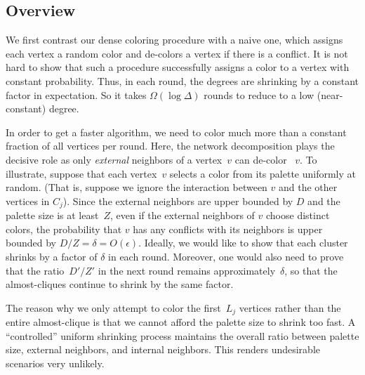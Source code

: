 \documentclass[11pt]{amsart}
\begin{document}
\subsection{Overview}
We first contrast our dense coloring procedure with a naive one, which assigns each vertex a random color and de-colors a vertex if there is a conflict. It is not hard to show that such a procedure successfully assigns a color to a vertex with constant probability. Thus, in each round, the degrees are shrinking by a constant factor in expectation. So it takes $\Omega(\log \Delta)$ rounds to reduce to a low (near-constant) degree.

In order to get a faster algorithm, we need to color much more than a constant fraction of all vertices per round. Here, the network decomposition plays the decisive role as only \emph{external} neighbors of a vertex~$v$ can de-color ~$v$. To illustrate, suppose that each vertex~$v$ selects a color from its palette uniformly at random. (That is, suppose we ignore the interaction between $v$ and the other vertices in $C_j$). Since the external neighbors are upper bounded by $D$ and the palette size is at least~$Z$, even if the external neighbors of $v$ choose distinct colors, the probability that $v$ has any conflicts with its neighbors is upper bounded by $D/Z = \delta = O(\epsilon)$. Ideally, we would like to show that each cluster shrinks by a factor of $\delta$ in each round. Moreover, one would also need to prove that the ratio~$D'/Z'$ in the next round remains approximately~$\delta$, so that the almost-cliques continue to shrink by the same factor.

The reason why we only attempt to color the first~$L_j$ vertices rather than the entire almost-clique is that we cannot afford the palette size to shrink too fast. A ``controlled'' uniform shrinking process maintains the overall ratio between palette size, external neighbors, and internal neighbors. This renders undesirable  scenarios very unlikely.
\end{document}
